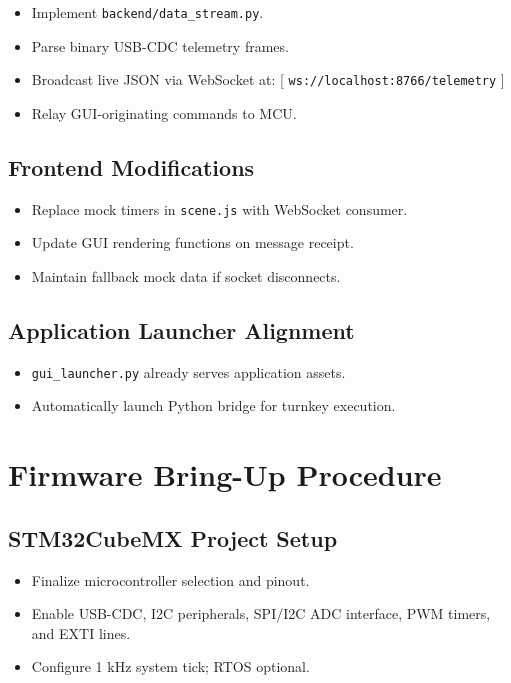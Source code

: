 \documentclass[12pt]{article}
\begin{document}
\begin{itemize}
\item Implement \texttt{backend/data\_stream.py}.
\item Parse binary USB-CDC telemetry frames.
\item Broadcast live JSON via WebSocket at:
[
\texttt{ws://localhost:8766/telemetry}
]
\item Relay GUI-originating commands to MCU.
\end{itemize}

\subsection{Frontend Modifications}

\begin{itemize}
\item Replace mock timers in \texttt{scene.js} with WebSocket consumer.
\item Update GUI rendering functions on message receipt.
\item Maintain fallback mock data if socket disconnects.
\end{itemize}

\subsection{Application Launcher Alignment}

\begin{itemize}
\item \texttt{gui\_launcher.py} already serves application assets.
\item Automatically launch Python bridge for turnkey execution.
\end{itemize}

\section{Firmware Bring-Up Procedure}

\subsection{STM32CubeMX Project Setup}

\begin{itemize}
\item Finalize microcontroller selection and pinout.
\item Enable USB-CDC, I2C peripherals, SPI/I2C ADC interface, PWM timers, and EXTI lines.
\item Configure 1 kHz system tick; RTOS optional.
\end{itemize}
\end{document}

